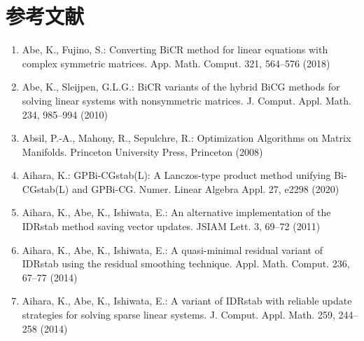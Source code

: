 \clearpage\section*{{参考文献}}
\makeatletter{}\label{chap:references}\makeatother
\begin{enumerate}[label=\arabic*.,ref=\arabic*,leftmargin=3em]

\item\label{bib:source-1}Abe, K., Fujino, S.: Converting BiCR method for linear equations with complex symmetric matrices. App. Math. Comput. 321, 564–576 (2018)

\item\label{bib:source-2}Abe, K., Sleijpen, G.L.G.: BiCR variants of the hybrid BiCG methods for solving linear systems with nonsymmetric matrices. J. Comput. Appl. Math. 234, 985–994 (2010)

\item\label{bib:source-3}Absil, P.-A., Mahony, R., Sepulchre, R.: Optimization Algorithms on Matrix Manifolds. Princeton University Press, Princeton (2008)

\item\label{bib:source-4}Aihara, K.: GPBi-CGstab(L): A Lanczos-type product method unifying Bi-CGstab(L) and GPBi-CG. Numer. Linear Algebra Appl. 27, e2298 (2020)

\item\label{bib:source-5}Aihara, K., Abe, K., Ishiwata, E.: An alternative implementation of the IDRstab method saving vector updates. JSIAM Lett. 3, 69–72 (2011)

\item\label{bib:source-6}Aihara, K., Abe, K., Ishiwata, E.: A quasi-minimal residual variant of IDRstab using the residual smoothing technique. Appl. Math. Comput. 236, 67–77 (2014)

\item\label{bib:source-7}Aihara, K., Abe, K., Ishiwata, E.: A variant of IDRstab with reliable update strategies for solving sparse linear systems. J. Comput. Appl. Math. 259, 244–258 (2014)


\end{enumerate}
